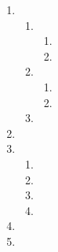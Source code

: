 \begin{enumerate}[noitemsep, label=\textbf{\arabic*}. ]
\begin{enumerate}[noitemsep, label=\textbf{(\alph*)} ]
\begin{enumerate}[noitemsep, label=\textbf{\roman*}. ]
\item %
\item %
\end{enumerate}
\item %
\item %
\end{enumerate}
\item %
 \begin{enumerate}[noitemsep, label=\textbf{(\alph*)} ]
\item %
\begin{enumerate}[noitemsep, label=\textbf{\roman*}. ] 
\item %
\item %
\end{enumerate}
\item %
\begin{enumerate}[noitemsep, label=\textbf{\roman*}. ] 
\item %
\item %
\end{enumerate}
\item %
\end{enumerate}
\item %
\item %
 \begin{enumerate}[noitemsep, label=\textbf{(\alph*)} ]
\item %
\item %
\item %
\item %
 \end{enumerate}
\item %
\item %

\end{enumerate}
